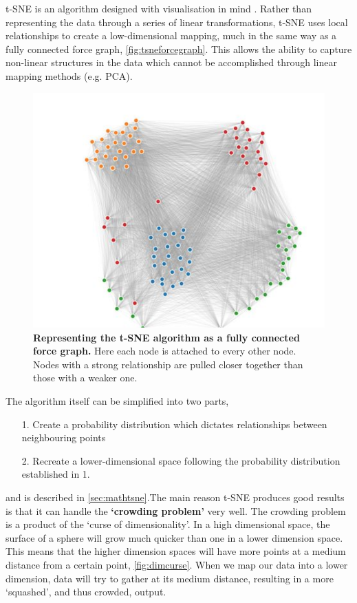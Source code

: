t-SNE is an algorithm designed with visualisation in mind \citep{tsne}. Rather than representing the data through a series of linear transformations, t-SNE uses local relationships to create a low-dimensional mapping, much in the same way as a fully connected force graph, \autoref{fig:tsneforcegraph}. This allows the ability to capture non-linear structures in the data which cannot be accomplished through linear mapping methods (e.g. PCA).

\begin{figure}[H]
    \centering
    \includegraphics[width=.6\textwidth]{./4fig/tsneforcegraph.png}
    \caption{\textbf{Representing the t-SNE algorithm as a fully connected force graph.} Here each node is attached to every other node. Nodes with a strong relationship are pulled closer together than those with a weaker one.}
    \label{fig:tsneforcegraph}
\end{figure}



The algorithm itself can be simplified into two parts,

\begin{itemize}
  \item [1.] Create a probability distribution which dictates relationships between neighbouring points
  \item [2.] Recreate a lower-dimensional space following the probability distribution established in 1.
\end{itemize}

and is described in \autoref{sec:mathtsne}.The main reason t-SNE produces good results is that it can handle the \textbf{`crowding problem'} very well. The crowding problem is a product of the `curse of dimensionality'. In a high dimensional space, the surface of a sphere will grow much quicker than one in a lower dimension space. This means that the higher dimension spaces will have more points at a medium distance from a certain point, \autoref{fig:dimcurse}. When we map our data into a lower dimension, data will try to gather at its medium distance, resulting in a more `squashed', and thus crowded, output.



